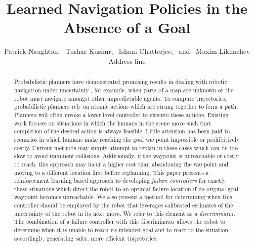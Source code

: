 \documentclass[letterpaper]{article}
\title{Learned Navigation Policies in the Absence of a Goal}
\author{Patrick Naughton, \ Tushar Kusnur, \ Ishani Chatterjee, \ and \ Maxim Likhachev\\
Address line\\
}
\begin{document}
	
	\maketitle
	
	\begin{abstract}
		Probabilistic planners have demonstrated promising results in dealing with robotic navigation under uncertainty \cite{ppcp}, for example, when parts of a map are unknown or the robot must navigate amongst other unpredictable agents. To compute trajectories, probabilistic planners rely on atomic actions which are strung together to form a path. Planners will often invoke a lower level controller to execute these actions. Existing work focuses on situations in which the humans in the scene move such that completion of the desired action is always feasible. Little attention has been paid to scenarios in which humans make reaching the goal waypoint impossible or prohibitively costly. Current methods may simply attempt to replan in these cases which can be too slow to avoid imminent collisions. Additionally, if the waypoint is unreachable or costly to reach, this approach may incur a higher cost than abandoning the waypoint and moving to a different location first before replanning. This paper presents a reinforcement learning based approach to developing \textit{failure controllers} for exactly these situations which direct the robot to an optimal failure location if its original goal waypoint becomes unreachable. We also present a method for determining when this controller should be employed by the robot that leverages calibrated estimates of the uncertainty of the robot in its next move. We refer to this element as a \textit{discriminator}. The combination of a failure controller with this discriminator allows the robot to determine when it is unable to reach its intended goal and to react to the situation accordingly, generating safer, more efficient trajectories.
	\end{abstract}
	
\end{document}
